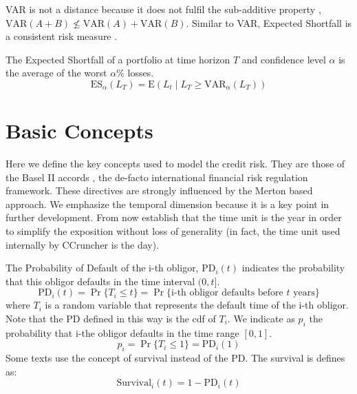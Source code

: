 \documentclass[11pt,fleqn]{book} %
\begin{document}
VAR is not a distance because it does not fulfil the sub-additive property 
\cite{var:varbad}, $\text{VAR}(A+B) \nleq \text{VAR}(A)+\text{VAR}(B)$. 
Similar to VAR, Expected Shortfall is a consistent risk measure 
\cite{var:eshortfall}.

\begin{definition}
	The Expected Shortfall of a portfolio at time horizon $T$ and 
	confidence level $\alpha$ is the average of the worst $\alpha\%$ losses.
	\begin{displaymath}
		\text{ES}_\alpha(L_T) = \text{E}(L_t \mid L_T \ge \text{VAR}_\alpha(L_T))
	\end{displaymath}
\end{definition}

\section{Basic Concepts}
\label{basic_concepts}

Here we define the key concepts used to model the credit risk.
They are those of the Basel II accords \cite{basel2:2006}, the 
de-facto international financial risk regulation framework. These
directives are strongly influenced by the Merton based approach.
We emphasize the temporal dimension because it is a key point in 
further development. From now establish that the time unit is the 
year in order to simplify the exposition without loss of generality
(in fact, the time unit used internally by CCruncher is the day).

\begin{definition}
	The Probability of Default of the i-th obligor, $\text{PD}_i(t)$
	indicates the probability that this obligor defaults in the time 
	interval $(0,t]$.
	\begin{displaymath}
		\text{PD}_i(t) = \Pr\{T_i \le t\} = 
		\Pr\{\text{i-th obligor defaults before $t$ years}\}
	\end{displaymath}
	where $T_i$ is a random variable that represents the default
	time of the i-th obligor. Note that the PD defined in this way 
	is the cdf of $T_i$. We indicate as $p_i$ the probability that 
	i-the obligor defaults in the time range $[0,1]$.
	\begin{displaymath}
		p_i = \Pr\{T_i \le 1\} = \text{PD}_i(1) 
	\end{displaymath}
	Some texts use the concept of survival instead of the PD. The 
	survival is defines as:
	\begin{displaymath}
		\text{Survival}_i(t) = 1-\text{PD}_i(t)
	\end{displaymath}
\end{definition}
\end{document}
